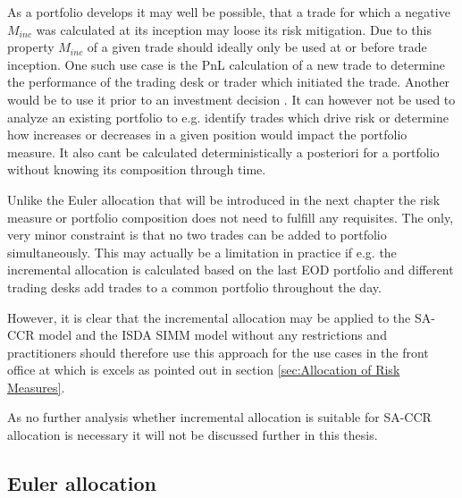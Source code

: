 \documentclass[../Thesis_AHoecherl.tex]{subfiles}
\begin{document}
As a portfolio develops it may well be possible, that a trade for which a negative $M_{inc}$ was calculated at its inception may loose its risk mitigation. 
Due to this property $M_{inc}$ of a given trade should ideally only be used at or before trade inception. 
One such use case is the PnL calculation of a new trade to determine the performance of the trading desk or trader which initiated the trade. 
Another would be to use it prior to an investment decision \cite{tibiletti2001incremental}. 
It can however not be used to analyze an existing portfolio to e.g. identify trades which drive risk or determine how increases or decreases in a given position would impact the portfolio measure. 
It also cant be calculated deterministically a posteriori for a portfolio without knowing its composition through time.

Unlike the Euler allocation that will be introduced in the next chapter the risk measure or portfolio composition does not need to fulfill any requisites. The only, very minor constraint is that no two trades can be added to portfolio simultaneously.
This may actually be a limitation in practice if e.g. the incremental allocation is calculated based on the last EOD portfolio and different trading desks add trades to a common portfolio throughout the day.

However, it is clear that the incremental allocation may be applied to the \gls{SA-CCR} model and the \gls{ISDA SIMM} model without any restrictions and practitioners should therefore use this approach for the use cases in the front office at which is excels as pointed out in section \ref{sec:Allocation of Risk Measures}.

As no further analysis whether incremental allocation is suitable for \gls{SA-CCR} allocation is necessary it will not be discussed further in this thesis.


\subsection{Euler allocation}\label{sec:Euler allocation}
\end{document}
